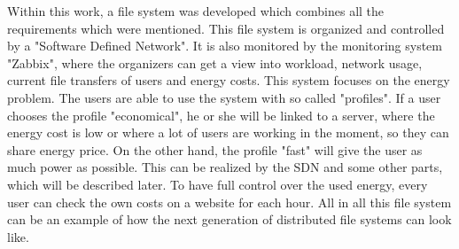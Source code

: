 Within this work, a file system was developed which combines all the requirements which were mentioned. This file system is organized and controlled by a "Software Defined Network". It is also monitored by the monitoring system "Zabbix", where the organizers can get a view into workload, network usage, current file transfers of users and energy costs. This system focuses on the energy problem. The users are able to use the system with so called "profiles". If a user chooses the profile "economical", he or she will be linked to a server, where the energy cost is low or where a lot of users are working in the moment, so they can share energy price. On the other hand, the profile "fast" will give the user as much power as possible. This can be realized by the SDN and some other parts, which will be described later. To have full control over the used energy, every user can check the own costs on a website for each hour. All in all this file system can be an example of how the next generation of distributed file systems can look like.               